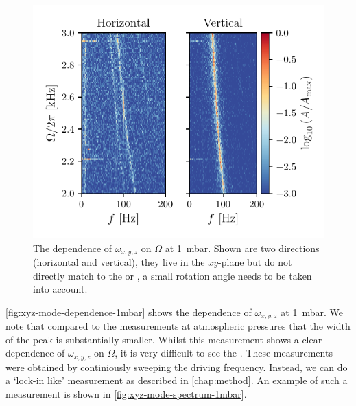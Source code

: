 \begin{figure}
    \centering
    \includegraphics{figures/data/xyz_mode_dependence_on_driving_frequency_spectrum.pdf}
    \caption{The dependence of $\omega_{x,y,z}$ on $\Omega$ at \qty{1}{\milli\bar}. Shown are two directions (horizontal and vertical), they live in the $xy$-plane but do not directly match to the \xmode or \ymode, a small rotation angle needs to be taken into account.}
    \label{fig:xyz-mode-dependence-1mbar}
\end{figure}

\autoref{fig:xyz-mode-dependence-1mbar} shows the dependence of $\omega_{x,y,z}$ at \qty{1}{\milli\bar}. We note that compared to the measurements at atmospheric pressures that the width of the peak is substantially smaller. Whilst this measurement shows a clear dependence of $\omega_{x,y,z}$ on $\Omega$, it is very difficult to see the \zmode. These measurements were obtained by continiously sweeping the driving frequency. Instead, we can do a `lock-in like' measurement as described in \autoref{chap:method}. An example of such a measurement is shown in \autoref{fig:xyz-mode-spectrum-1mbar}.


